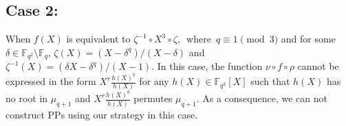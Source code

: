 \documentclass[12pt]{amsart}
\newtheorem{rmk}[thm]{Remark}
\numberwithin{equation}{section}
\theoremstyle{definition}
\newcommand{\F}{\mathbb F}
\begin{document}
% 

\subsection*{Case 2:} When $f(X)$ is equivalent to $\zeta^{-1} \circ X^3 \circ \zeta,$~\mbox{where}~$q\equiv1 \pmod 3$ and for some $\delta \in \F_{q^2}\setminus \F_q$, $\zeta(X)=(X-\delta^q)/(X-\delta)$ and $ \zeta^{-1}(X)=(\delta X-\delta^q)/(X-1)$.
In this case, the function $\nu \circ f \circ \rho$ cannot be expressed in the form $X^r\frac{h(X)^q}{h(X)}$ for any $h(X)\in \F_{q^2}[X]$ such that $h(X)$ has no root in $\mu_{q+1}$ and  $X^r\frac{h(X)^q}{h(X)}$ permutes $\mu_{q+1}$. As a consequence, we can not construct PPs using our strategy in this case.
\end{document}
